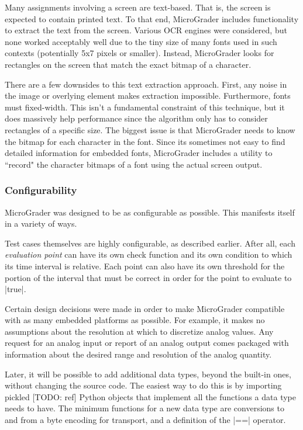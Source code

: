 \documentclass[12pt]{article}
\begin{document}
Many assignments involving a screen are text-based.  That is, the screen is expected to contain printed text.  To that end, MicroGrader includes functionality to extract the text from the screen.  Various OCR engines were considered, but none worked acceptably well due to the tiny size of many fonts used in such contexts (potentially 5x7 pixels or smaller).  Instead, MicroGrader looks for rectangles on the screen that match the exact bitmap of a character.

There are a few downsides to this text extraction approach.  First, any noise in the image or overlying element makes extraction impossible.  Furthermore, fonts must fixed-width.  This isn't a fundamental constraint of this technique, but it does massively help performance since the algorithm only has to consider rectangles of a specific size.  The biggest issue is that MicroGrader needs to know the bitmap for each character in the font.  Since its sometimes not easy to find detailed information for embedded fonts, MicroGrader includes a utility to ``record" the character bitmaps of a font using the actual screen output.

\subsubsection{Configurability}
MicroGrader was designed to be as configurable as possible.  This manifests itself in a variety of ways.

Test cases themselves are highly configurable, as described earlier.  After all, each \textit{evaluation point} can have its own check function and its own condition to which its time interval is relative.  Each point can also have its own threshold for the portion of the interval that must be correct in order for the point to evaluate to |true|.

Certain design decisions were made in order to make MicroGrader compatible with as many embedded platforms as possible.  For example, it makes no assumptions about the resolution at which to discretize analog values.  Any request for an analog input or report of an analog output comes packaged with information about the desired range and resolution of the analog quantity.

Later, it will be possible to add additional data types, beyond the built-in ones, without changing the source code.  The easiest way to do this is by importing pickled [TODO: ref] Python objects that implement all the functions a data type needs to have.  The minimum functions for a new data type are conversions to and from a byte encoding for transport, and a definition of the |==| operator.
\end{document}

